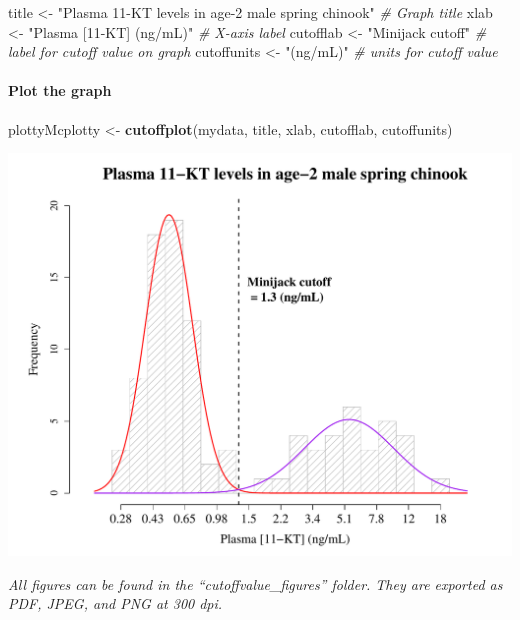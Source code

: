 \documentclass[
]{article}
\newenvironment{Shaded}{\begin{snugshade}}{\end{snugshade}}
\newcommand{\CommentTok}[1]{\textcolor[rgb]{0.56,0.35,0.01}{\textit{#1}}}
\newcommand{\FunctionTok}[1]{\textcolor[rgb]{0.13,0.29,0.53}{\textbf{#1}}}
\newcommand{\NormalTok}[1]{#1}
\newcommand{\OtherTok}[1]{\textcolor[rgb]{0.56,0.35,0.01}{#1}}
\newcommand{\StringTok}[1]{\textcolor[rgb]{0.31,0.60,0.02}{#1}}
\begin{document}
\begin{Shaded}
\begin{Highlighting}[]
\NormalTok{title }\OtherTok{\textless{}{-}} \StringTok{"Plasma 11{-}KT levels in age{-}2 male spring chinook"}  \CommentTok{\# Graph title}
\NormalTok{xlab }\OtherTok{\textless{}{-}} \StringTok{"Plasma [11{-}KT] (ng/mL)"} \CommentTok{\# X{-}axis label}
\NormalTok{cutofflab }\OtherTok{\textless{}{-}} \StringTok{"Minijack cutoff"} \CommentTok{\# label for cutoff value on graph}
\NormalTok{cutoffunits }\OtherTok{\textless{}{-}} \StringTok{"(ng/mL)"} \CommentTok{\# units for cutoff value}
\end{Highlighting}
\end{Shaded}

\paragraph{Plot the graph}\label{plot-the-graph-1}

\begin{Shaded}
\begin{Highlighting}[]
\NormalTok{plottyMcplotty }\OtherTok{\textless{}{-}} \FunctionTok{cutoffplot}\NormalTok{(mydata, title, xlab, cutofflab, cutoffunits)}
\end{Highlighting}
\end{Shaded}

\begin{center}\includegraphics{man/cutoffvalue_figures/README-pretty_graph-1} \end{center}

\emph{All figures can be found in the ``cutoffvalue\_figures'' folder.
They are exported as PDF, JPEG, and PNG at 300 dpi.}
\end{document}
